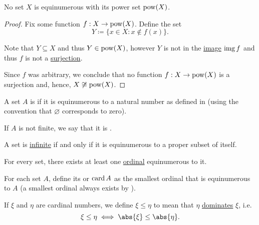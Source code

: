 \begin{theorem}[Cantor]\label{thm:cantor_power_set_theorem}
  No set \( X \) is equinumerous with its power set \( \operatorname{pow}(X) \).
\end{theorem}
\begin{proof}
  Fix some function \( f: X \to \operatorname{pow}(X) \). Define the set
  \begin{equation*}
    Y \coloneqq \{ x \in X \colon x \not\in f(x) \}.
  \end{equation*}

  Note that \( Y \subseteq X \) and thus \( Y \in \operatorname{pow}(X) \), however \( Y \) is not in the \hyperref[def:function]{image} \( \operatorname{img} f \) and thus \( f \) is not a \hyperref[def:function_invertibility/surjection]{surjection}.

  Since \( f \) was arbitrary, we conclude that no function \( f: X \to \operatorname{pow}(X) \) is a surjection and, hence, \( X \not\cong \operatorname{pow}(X) \).
\end{proof}

\begin{definition}\label{def:finite_set}
  A set \( A \) is  if it is equinumerous to a natural number as defined in  (using the convention that \( \varnothing \) corresponds to zero).

  If \( A \) is not finite, we say that it is .
\end{definition}

\begin{proposition}\label{thm:infinite_set_iff_equinumerous_to_proper_subset}
  A set is \hyperref[def:finite_set]{infinite} if and only if it is equinumerous to a proper subset of itself.
\end{proposition}

\medskip

\begin{theorem}\label{thm:equinumerous_ordinal_existence}
  For every set, there exists at least one \hyperref[def:ordinal]{ordinal} equinumerous to it.
\end{theorem}

\medskip

\begin{definition}\label{def:cardinal}
  For each set \( A \), define its  or  \( \operatorname{card} A \) as the smallest ordinal that is equinumerous to \( A \) (a smallest ordinal always exists by ).

  If \( \xi \) and \( \eta \) are cardinal numbers, we define \( \xi \leq \eta \) to mean that \( \eta \) \hyperref[def:set_domination]{dominates} \( \xi \), i.e.
  \begin{equation*}
    \xi \leq \eta \iff \abs{\xi} \leq \abs{\eta}.
  \end{equation*}
\end{definition}


